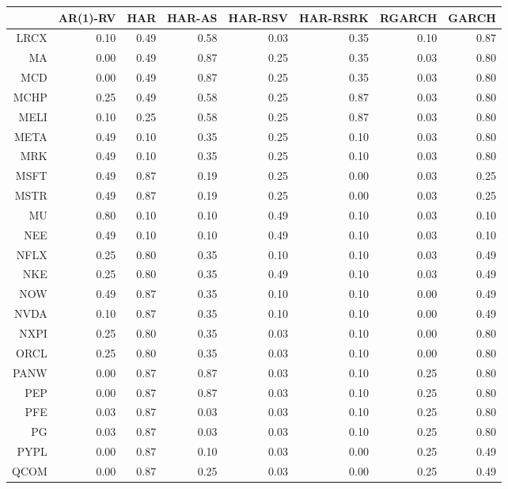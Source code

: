 \begin{table}[ht]
\centering
\begin{tabular}{rrrrrrrr}
  \hline
 & AR(1)-RV & HAR & HAR-AS & HAR-RSV & HAR-RSRK & RGARCH & GARCH \\ 
  \hline
LRCX & 0.10 & 0.49 & 0.58 & 0.03 & 0.35 & 0.10 & 0.87 \\ 
  MA & 0.00 & 0.49 & 0.87 & 0.25 & 0.35 & 0.03 & 0.80 \\ 
  MCD & 0.00 & 0.49 & 0.87 & 0.25 & 0.35 & 0.03 & 0.80 \\ 
  MCHP & 0.25 & 0.49 & 0.58 & 0.25 & 0.87 & 0.03 & 0.80 \\ 
  MELI & 0.10 & 0.25 & 0.58 & 0.25 & 0.87 & 0.03 & 0.80 \\ 
  META & 0.49 & 0.10 & 0.35 & 0.25 & 0.10 & 0.03 & 0.80 \\ 
  MRK & 0.49 & 0.10 & 0.35 & 0.25 & 0.10 & 0.03 & 0.80 \\ 
  MSFT & 0.49 & 0.87 & 0.19 & 0.25 & 0.00 & 0.03 & 0.25 \\ 
  MSTR & 0.49 & 0.87 & 0.19 & 0.25 & 0.00 & 0.03 & 0.25 \\ 
  MU & 0.80 & 0.10 & 0.10 & 0.49 & 0.10 & 0.03 & 0.10 \\ 
  NEE & 0.49 & 0.10 & 0.10 & 0.49 & 0.10 & 0.03 & 0.10 \\ 
  NFLX & 0.25 & 0.80 & 0.35 & 0.10 & 0.10 & 0.03 & 0.49 \\ 
  NKE & 0.25 & 0.80 & 0.35 & 0.49 & 0.10 & 0.03 & 0.49 \\ 
  NOW & 0.49 & 0.87 & 0.35 & 0.10 & 0.10 & 0.00 & 0.49 \\ 
  NVDA & 0.10 & 0.87 & 0.35 & 0.10 & 0.10 & 0.00 & 0.49 \\ 
  NXPI & 0.25 & 0.80 & 0.35 & 0.03 & 0.10 & 0.00 & 0.80 \\ 
  ORCL & 0.25 & 0.80 & 0.35 & 0.03 & 0.10 & 0.00 & 0.80 \\ 
  PANW & 0.00 & 0.87 & 0.87 & 0.03 & 0.10 & 0.25 & 0.80 \\ 
  PEP & 0.00 & 0.87 & 0.87 & 0.03 & 0.10 & 0.25 & 0.80 \\ 
  PFE & 0.03 & 0.87 & 0.03 & 0.03 & 0.10 & 0.25 & 0.80 \\ 
  PG & 0.03 & 0.87 & 0.03 & 0.03 & 0.10 & 0.25 & 0.80 \\ 
  PYPL & 0.00 & 0.87 & 0.10 & 0.03 & 0.00 & 0.25 & 0.49 \\ 
  QCOM & 0.00 & 0.87 & 0.25 & 0.03 & 0.00 & 0.25 & 0.49 \\ 

\end{tabular}
\end{table}
